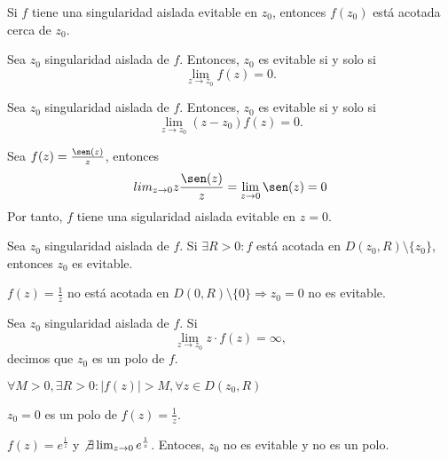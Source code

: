 \begin{obs}
  Si $f$ tiene una singularidad aislada evitable en $z_{0}$, entonces $f(z_{0})$ está acotada cerca de $z_{0}$.
\end{obs}

\begin{prop}
  Sea $z_{0}$ singularidad aislada de $f$. Entonces, $z_{0}$ es evitable si y solo si
  \[
    \lim_{z \rightarrow z_{0}} f(z) = 0.
  \]
\end{prop}

\begin{prop}
  Sea $z_{0}$ singularidad aislada de $f$. Entonces, $z_{0}$ es evitable si y solo si
  \[ 
    \lim_{z \rightarrow z_{0}} (z - z_{0}) f(z)  = 0.
  \] 
\end{prop}

\begin{ejm}
  Sea $f(z) = \frac{\sen(z)}{z}$, entonces
  \[ 
    lim_{z \rightarrow 0} z \frac{\sen(z)}{z} = \lim_{z \rightarrow 0} \sen(z)  = 0
  \] 
  Por tanto, $f$ tiene una sigularidad aislada evitable en $z = 0$.
\end{ejm}

\begin{cor}
  Sea $z_{0}$ singularidad aislada de $f$. Si $\exists R>0 : f$ está acotada en $D(z_{0}, R) \setminus \{ z_{0} \}$, entonces $z_{0}$ es evitable.
\end{cor}

\begin{ejm}
  $f(z) = \frac{1}{z}$ no está acotada en $D(0, R) \setminus \{ 0 \} \Rightarrow z_{0} = 0$ no es evitable.
\end{ejm}

\begin{defn}[Polo]
  Sea $z_{0}$ singularidad aislada de $f$. Si
  \[ 
    \lim_{z \rightarrow z_{0}} z \cdot f(z) = \infty, 
  \] 
  decimos que $z_{0}$ es un polo de $f$.
\end{defn}

\begin{obs}
  $\forall M >0, \exists R > 0 : | f(z) | > M , \forall z \in D(z_{0}, R)$
\end{obs}

\begin{ejm}
  $z_{0} = 0$ es un polo de $f(z) = \frac{1}{z}$.
\end{ejm}

\begin{ejm}
  $f(z) = e^{\frac{1}{z}}$ y $\not \exists \lim_{z \rightarrow 0} e^{\frac{1}{z}}$. Entoces, $ z_{0}$ no es evitable y no es un polo.
\end{ejm}

